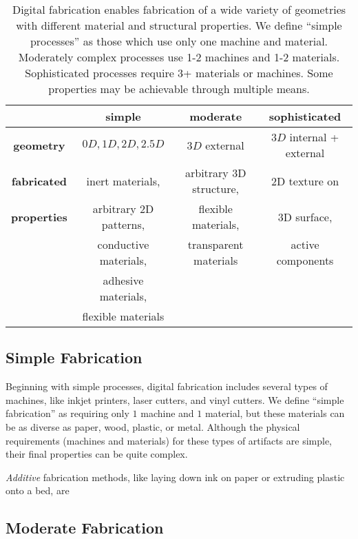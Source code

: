 \begin{table}
\begin{center}
\begin{tabular}{|c|c|c|c|}
\hline
\textbf{ }& \textbf{simple} & \textbf{moderate} & \textbf{sophisticated} \\
\hline
\textbf{geometry} & $0D,1D,2D,2.5D$ & $3D$ external & $3D$ internal + external \\
\hline
\textbf{fabricated} & inert materials, & arbitrary 3D structure, & 2D texture on \\
\textbf{properties} & arbitrary 2D patterns, & flexible materials, &  3D surface,\\
 & conductive materials, & transparent materials & active components \\
 & adhesive materials, & & \\
 & flexible materials & & \\
\hline
\end{tabular}
\end{center}
\caption{Digital fabrication enables fabrication of a wide variety of geometries with different material and structural properties. We define ``simple processes'' as those which use only one machine and material. Moderately complex processes use 1-2 machines and 1-2 materials. Sophisticated processes require 3+ materials or machines. Some properties may be achievable through multiple means.}
\label{table:properties}
\end{table}

\subsection{Simple Fabrication}
Beginning with simple processes, digital fabrication includes several types of machines, like inkjet printers, laser cutters, and vinyl cutters. We define ``simple fabrication'' as requiring only $1$ machine and $1$ material, but these materials can be as diverse as paper, wood, plastic, or metal. Although the physical requirements (machines and materials) for these types of artifacts are simple, their final properties can be quite complex. 

\emph{Additive} fabrication methods, like laying down ink on paper or extruding plastic onto a bed, are 

\subsection{Moderate Fabrication}

